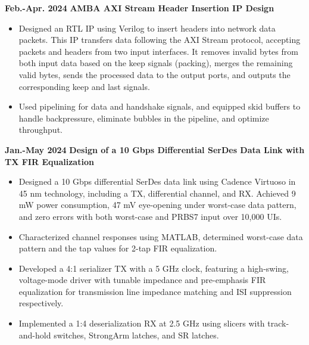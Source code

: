 \documentclass[11pt,a4paper,sans]{moderncv}
\begin{document}
\cventry
{\textnormal{\textbf{Feb.-Apr. 2024}}}
{\textnormal{\textbf{AMBA AXI Stream Header Insertion IP Design}}}
{}{}{}
{
    \begin{itemize}
        \item Designed an RTL IP using Verilog to insert headers into network data packets. This IP transfers data following the AXI Stream protocol, accepting packets and headers from two input interfaces. It removes invalid bytes from both input data based on the keep signals (packing), merges the remaining valid bytes, sends the processed data to the output ports, and outputs the corresponding keep and last signals.
        \item Used pipelining for data and handshake signals, and equipped skid buffers to handle backpressure, eliminate bubbles in the pipeline, and optimize throughput.
    \end{itemize}
}


\cventry
{\textnormal{\textbf{Jan.-May 2024}}}
{\textnormal{\textbf{Design of a 10 Gbps Differential SerDes Data Link with TX FIR Equalization}}}
{}{}{}
{
    \begin{itemize}
        \item Designed a 10 Gbps differential SerDes data link using Cadence Virtuoso in 45 nm technology, including a TX, differential channel, and RX. Achieved 9 mW power consumption, 47 mV eye-opening under worst-case data pattern, and zero errors with both worst-case and PRBS7 input over 10,000 UIs.
        \item Characterized channel responses using MATLAB, determined worst-case data pattern and the tap values for 2-tap FIR equalization.
        \item Developed a 4:1 serializer TX with a 5 GHz clock, featuring a high-swing, voltage-mode driver with tunable impedance and pre-emphasis FIR equalization for transmission line impedance matching and ISI suppression respectively.
        \item Implemented a 1:4 deserialization RX at 2.5 GHz using slicers with track-and-hold switches, StrongArm latches, and SR latches.
    \end{itemize}
}
\end{document}
